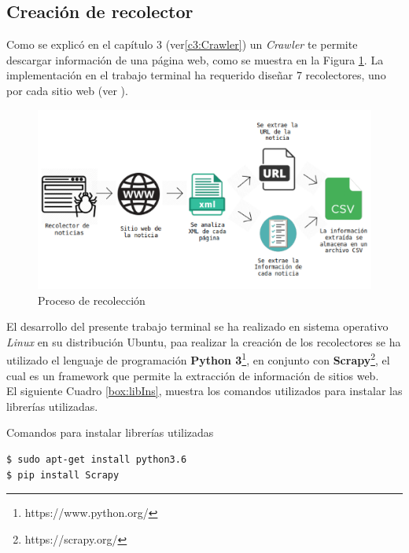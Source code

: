 \subsection{Creación de recolector}

Como se explicó en el capítulo 3 (ver\ref{c3:Crawler}) un \textit{Crawler} te permite descargar información de una página web, como se muestra en la Figura \ref{Fig:recoleccion}. La implementación en el trabajo terminal ha requerido diseñar 7 recolectores, uno por cada sitio web (ver ). \\

\begin{figure}[H]
	\centering
	\includegraphics[scale=.2]{imagenes/Capitulo5/recoleccion.png}
	\caption{Proceso de recolección}
	\label{Fig:recoleccion}
\end{figure}

El desarrollo del presente trabajo terminal se ha realizado en sistema operativo \textit{Linux} en su distribución Ubuntu, paa realizar la creación de los recolectores se ha utilizado el lenguaje de programación \textbf{Python 3}\footnote{https://www.python.org/}, en conjunto con \textbf{Scrapy}\footnote{https://scrapy.org/}, el cual es un framework que permite la extracción de información de sitios web. 
\\
El siguiente Cuadro \ref{box:libIns}, muestra los comandos utilizados para instalar las librerías utilizadas.\\
\begin{mygraybox}[label={box:libIns}]{Comandos para instalar librerías utilizadas}
\begin{verbatim}
$ sudo apt-get install python3.6
$ pip install Scrapy
\end{verbatim}
\end{mygraybox}

